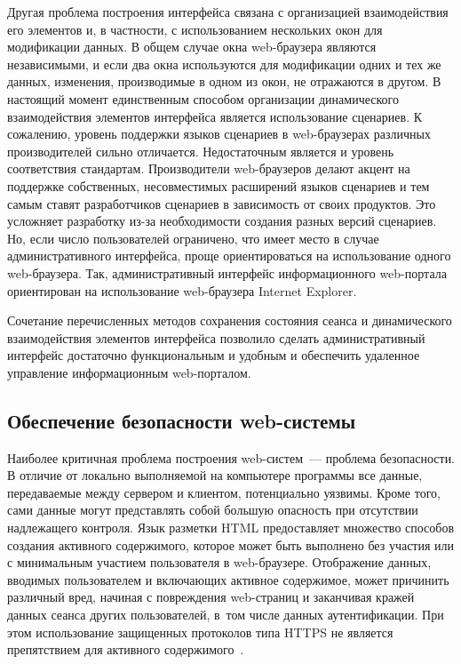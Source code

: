 \begin{multicols}{2}
 Другая проблема построения интерфейса связана с организацией взаимодействия
его элементов и, в частности, с использованием нескольких окон для модификации
данных. В общем случае окна web-браузера являются независимыми, и если два окна
используются для модификации одних и тех же данных, изменения, производимые в
одном из окон, не отражаются в другом. В настоящий момент единственным способом
организации динамического взаимодействия элементов интерфейса является
использование сценариев. К сожалению, уровень поддержки языков сценариев в
 web-браузерах различных производителей сильно отличается.
 Недостаточным
является и уровень соответствия стандартам. Производители web-браузеров делают
акцент на поддержке собственных, несовместимых расширений языков сценариев и тем
самым ставят разработчиков сценариев в зависимость от своих продуктов. Это усложняет
разработку из-за необходимости создания разных версий сценариев. Но, если число
пользователей ограничено, что имеет место в случае административного интерфейса,
проще ориентироваться на использование одного web-браузера. Так, административный
интерфейс информационного web-портала ориентирован на использование web-браузера
Internet Explorer.

 Сочетание перечисленных методов сохранения состояния сеанса и динамического
взаимодействия элементов интерфейса позволило сделать административный интерфейс
достаточно функциональным и удобным и обеспечить удаленное управление
информационным web-порталом.

\subsection{Обеспечение безопасности web-системы} %

\vspace*{-2pt}

 Наиболее критичная проблема построения web-систем~--- проблема безопасности.
В отличие от локально выполняемой на компьютере программы все данные,
передаваемые между сервером и клиентом, потенциально уязвимы. Кроме того, сами
данные могут представлять собой большую опасность при отсутствии надлежащего
контроля. Язык разметки HTML предоставляет множество способов создания активного
содержимого, которое может быть выполнено без участия или с минимальным участием
пользователя в web-браузере. Отображение данных, вводимых пользователем и
вклю\-ча\-ющих активное содержимое, может причинить различный вред, начиная с
повреждения web-страниц и заканчивая кражей данных сеанса других пользователей,
в~том числе данных аутентификации. При этом использование защищенных протоколов типа
HTTPS не является препятствием для активного содержимого~\cite{10bos}.


\end{multicols}
